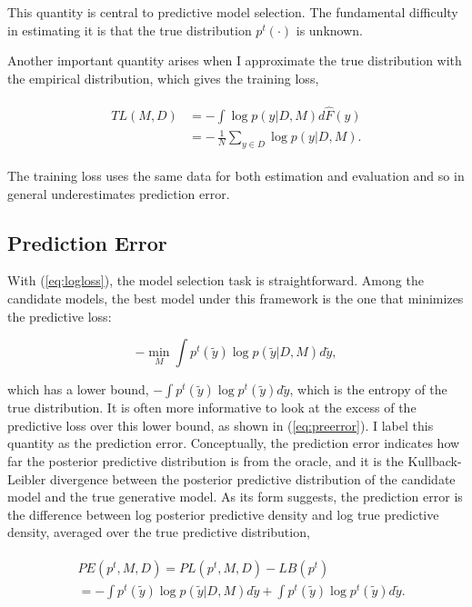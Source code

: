 \noindent This quantity is central to predictive model selection. The
fundamental difficulty in estimating it is that the true distribution
\(p^t(\cdot)\) is unknown.

Another important quantity arises when I approximate the true
distribution with the empirical distribution, which gives the training
loss,

\begin{align}
  \begin{split}
  \label{eq:trloss}
  TL(M, D)&=-\int \log p(y|D, M) d\hat{F}(y)\\
  &=-\,\frac{1}{N}\sum_{y\in D}\log p(y | D, M).
  \end{split}
\end{align}

The training loss uses the same data for both estimation and evaluation
and so in general underestimates prediction error.

\subsection{Prediction Error}\label{prediction-error}

With (\ref{eq:logloss}), the model selection task is straightforward.
Among the candidate models, the best model under this framework is the
one that minimizes the predictive loss:

\begin{equation}
  \label{eq:minimizer}
  - \min_{M} \int \!p^t(\tilde y) \log p(\tilde y|D, M) d\tilde y,
  \end{equation}

which has a lower bound,
\(-\!\int\! p^t(\tilde y) \log p^t(\tilde y) d\tilde y\), which is the
entropy of the true distribution. It is often more informative to look
at the excess of the predictive loss over this lower bound, as shown in
(\ref{eq:preerror}). I label this quantity as the prediction error.
Conceptually, the prediction error indicates how far the posterior
predictive distribution is from the oracle, and it is the
Kullback-Leibler divergence between the posterior predictive
distribution of the candidate model and the true generative model. As
its form suggests, the prediction error is the difference between log
posterior predictive density and log true predictive density, averaged
over the true predictive distribution,

\begin{align}
\begin{split}
  \label{eq:preerror}
    &PE(p^t, M, D)= PL(p^t, M, D) - LB(p^t) \\  
               &=-\int p^t(\tilde y) \log p(\tilde y|D, M) d\tilde y+\int
               p^t(\tilde y) \log p^t(\tilde y) d\tilde y.
               \end{split}
\end{align}

